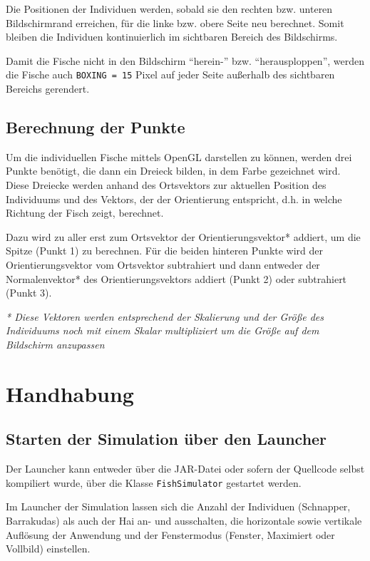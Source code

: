 \documentclass[11pt]{article}
\begin{document}
\vspace{0.5em}
Die Positionen der Individuen werden, sobald sie den rechten bzw. unteren Bildschirmrand erreichen, für die linke bzw. obere Seite neu berechnet. Somit bleiben die Individuen kontinuierlich im sichtbaren Bereich des Bildschirms.

\vspace{0.5em}
Damit die Fische nicht in den Bildschirm ``herein-'' bzw. ``herausploppen'', werden die Fische auch \lstinline{BOXING = 15} Pixel auf jeder Seite außerhalb des sichtbaren Bereichs gerendert.
\subsection{Berechnung der Punkte}
Um die individuellen Fische mittels OpenGL darstellen zu können, werden drei Punkte benötigt, die dann ein Dreieck bilden, in dem Farbe gezeichnet wird. Diese Dreiecke werden anhand des Ortsvektors zur aktuellen Position des Individuums und des Vektors, der der Orientierung entspricht, d.h. in welche Richtung der Fisch zeigt, berechnet.

\vspace{0.5em}
\newpage
Dazu wird zu aller erst zum Ortsvektor der Orientierungsvektor* addiert, um die Spitze (Punkt 1) zu berechnen. Für die beiden hinteren Punkte wird der Orientierungsvektor vom Ortsvektor subtrahiert und dann entweder der Normalenvektor* des Orientierungsvektors addiert (Punkt 2) oder subtrahiert (Punkt 3).

\vspace{0.5em}
\textit{* Diese Vektoren werden entsprechend der Skalierung und der Größe des Individuums noch mit einem Skalar multipliziert um die Größe auf dem Bildschirm anzupassen}


\section{Handhabung}
\subsection{Starten der Simulation über den Launcher}
Der Launcher kann entweder über die JAR-Datei oder sofern der Quellcode selbst kompiliert wurde, über die Klasse \lstinline{FishSimulator} gestartet werden.

\vspace{0.5em}
Im Launcher der Simulation lassen sich die Anzahl der Individuen (Schnapper, Barrakudas) als auch der Hai an- und ausschalten, die horizontale sowie vertikale Auflösung der Anwendung und der Fenstermodus (Fenster, Maximiert oder Vollbild) einstellen.
\end{document}

